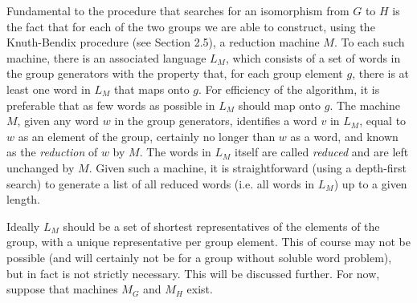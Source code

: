 Fundamental to the procedure that searches for an isomorphism
from $G$ to $H$ is the fact that
for each of the two groups we are able to construct, using the Knuth-Bendix
procedure (see Section 2.5), a reduction machine $M$.
To each such machine, there is an associated language $L_M$, which consists of
a set of words in the group generators with the property that, for each group
element $g$, there is at least one word in $L_M$ that maps onto $g$. For
efficiency of the algorithm, it is preferable that as few words as
possible in $L_M$ should map onto $g$. The machine $M$,
given any word $w$ in the group generators, identifies a word $v$ in $L_M$,
equal to $w$ as an element of the group, certainly no longer than $w$ as a
word, and known as the {\em reduction } of $w$ by $M$. The words in $L_M$
itself are called {\em reduced} and are left unchanged by $M$. Given such
a machine, it is straightforward (using a depth-first search) to generate
a list of all reduced words (i.e. all words in $L_M$) up to a given length.

Ideally $L_M$ should be a set of shortest representatives of the
elements of the group, with a unique representative per group element. This
of course may not be possible (and will certainly not be for a group without
soluble word problem), but in fact is not strictly necessary. This will be
discussed further. For now, suppose that machines $M_G$ and $M_H$ exist.

